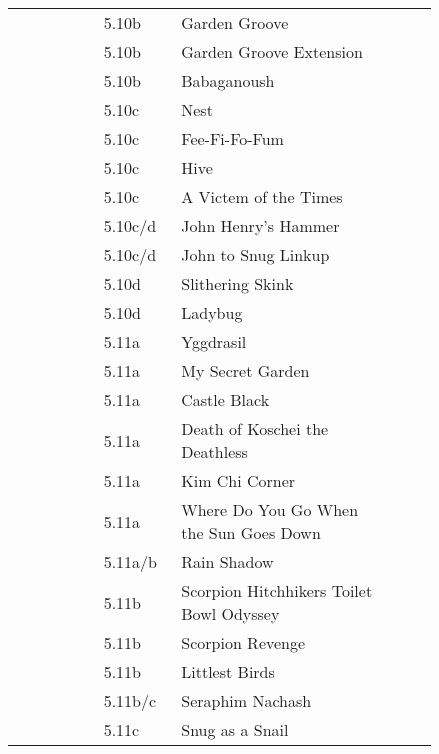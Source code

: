 \begin{flushleft}
\begin{center}
\begin{supertabular}{p{0.18\linewidth}p{0.13\linewidth}p{0.45\linewidth}p{0.08\linewidth}}
&5.10b&Garden Groove & \pageref{rt:Garden Groove} \\
&5.10b&Garden Groove Extension & \pageref{vr:Garden Groove Extension} \\
&5.10b&Babaganoush & \pageref{rt:Babaganoush} \\
&5.10c&Nest & \pageref{rt:Nest} \\
&5.10c&Fee-Fi-Fo-Fum & \pageref{rt:Fee-Fi-Fo-Fum} \\
&5.10c&Hive & \pageref{rt:Hive} \\
&5.10c&A Victem of the Times & \pageref{vr:A Victem of the Times} \\
&5.10c/d&John Henry's Hammer & \pageref{rt:John Henry's Hammer} \\
&5.10c/d&John to Snug Linkup & \pageref{vr:John to Snug Linkup} \\
&5.10d&Slithering Skink & \pageref{rt:Slithering Skink} \\
&5.10d&Ladybug & \pageref{rt:Ladybug} \\
&5.11a&Yggdrasil & \pageref{rt:Yggdrasil} \\
&5.11a&My Secret Garden & \pageref{rt:My Secret Garden} \\
&5.11a&Castle Black & \pageref{rt:Castle Black} \\
&5.11a&Death of Koschei the Deathless & \pageref{rt:Death of Koschei the Deathless} \\
&5.11a&Kim Chi Corner & \pageref{rt:Kim Chi Corner} \\
&5.11a&Where Do You Go When the Sun Goes Down & \pageref{rt:Where Do You Go When the Sun Goes Down} \\
&5.11a/b&Rain Shadow & \pageref{rt:Rain Shadow} \\
&5.11b&Scorpion Hitchhikers Toilet Bowl Odyssey & \pageref{rt:Scorpion Hitchhikers Toilet Bowl Odyssey} \\
&5.11b&Scorpion Revenge & \pageref{rt:Scorpion Revenge} \\
&5.11b&Littlest Birds & \pageref{rt:Littlest Birds} \\
&5.11b/c&Seraphim Nachash & \pageref{rt:Seraphim Nachash} \\
&5.11c&Snug as a Snail & \pageref{rt:Snug as a Snail} \\

\end{supertabular}
\end{center}
\end{flushleft}
